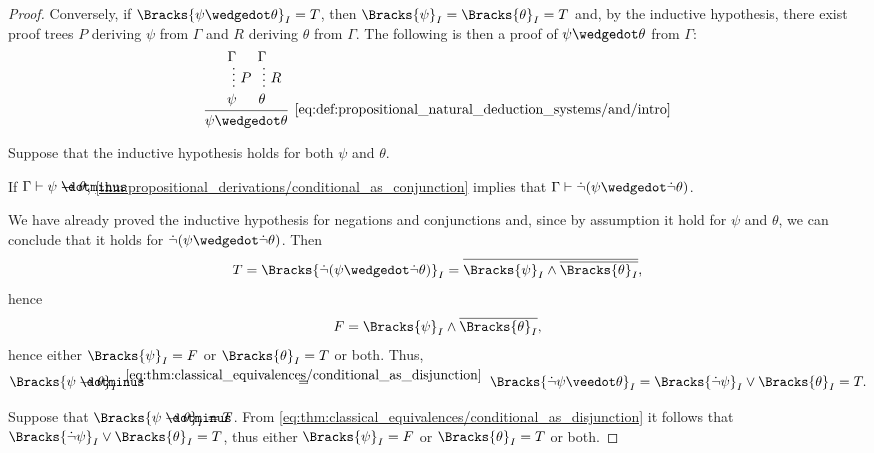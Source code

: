 \begin{proof}
  \NecessitySubProof* Conversely, if \( \Bracks{\psi \synwedge \theta}_I = T \), then \( \Bracks{\psi}_I = \Bracks{\theta}_I = T \) and, by the inductive hypothesis, there exist proof trees \( P \) deriving \( \psi \) from \( \Gamma \) and \( R \) deriving \( \theta \) from \( \Gamma \). The following is then a proof of \( \psi \synwedge \theta \) from \( \Gamma \):
  \begin{equation*}
    \begin{prooftree}
      \hypo{ \Gamma }
      \ellipsis {\( P \)} { \psi }

      \hypo{ \Gamma }
      \ellipsis {\( R \)} { \theta }

      \infer2[\ref{eq:def:propositional_natural_deduction_systems/and/intro}]{ \psi \synwedge \theta }
    \end{prooftree}
  \end{equation*}

   Suppose that the inductive hypothesis holds for both \( \psi \) and \( \theta \).

  \SufficiencySubProof* If \( \Gamma \vdash \psi \synimplies \theta \), \eqref{thm:propositional_derivations/conditional_as_conjunction} implies that \( \Gamma \vdash \synneg(\psi \synwedge \synneg \theta) \).

  We have already proved the inductive hypothesis for negations and conjunctions and, since by assumption it hold for \( \psi \) and \( \theta \), we can conclude that it holds for \( \synneg(\psi \synwedge \synneg \theta) \). Then
  \begin{equation*}
    T
    =
    \Bracks{\synneg(\psi \synwedge \synneg \theta)}_I
    =
    \oline{\Bracks{\psi}_I \wedge \oline{\Bracks{\theta}_I}},
  \end{equation*}
  hence
  \begin{equation*}
    F = \Bracks{\psi}_I \wedge \oline{\Bracks{\theta}_I},
  \end{equation*}
  hence either \( \Bracks{\psi}_I = F \) or \( \Bracks{\theta}_I = T \) or both. Thus,
  \begin{equation*}
    \Bracks{\psi \synimplies \theta}_I
    \reloset {\eqref{eq:thm:classical_equivalences/conditional_as_disjunction}} =
    \Bracks{\synneg \psi \synvee \theta}_I
    =
    \Bracks{\synneg \psi}_I \vee \Bracks{\theta}_I
    =
    T.
  \end{equation*}

  \NecessitySubProof* Suppose that \( \Bracks{\psi \synimplies \theta}_I = T \). From \eqref{eq:thm:classical_equivalences/conditional_as_disjunction} it follows that \( \Bracks{\synneg \psi}_I \vee \Bracks{\theta}_I = T \), thus either \( \Bracks{\psi}_I = F \) or \( \Bracks{\theta}_I = T \) or both.


\end{proof}
